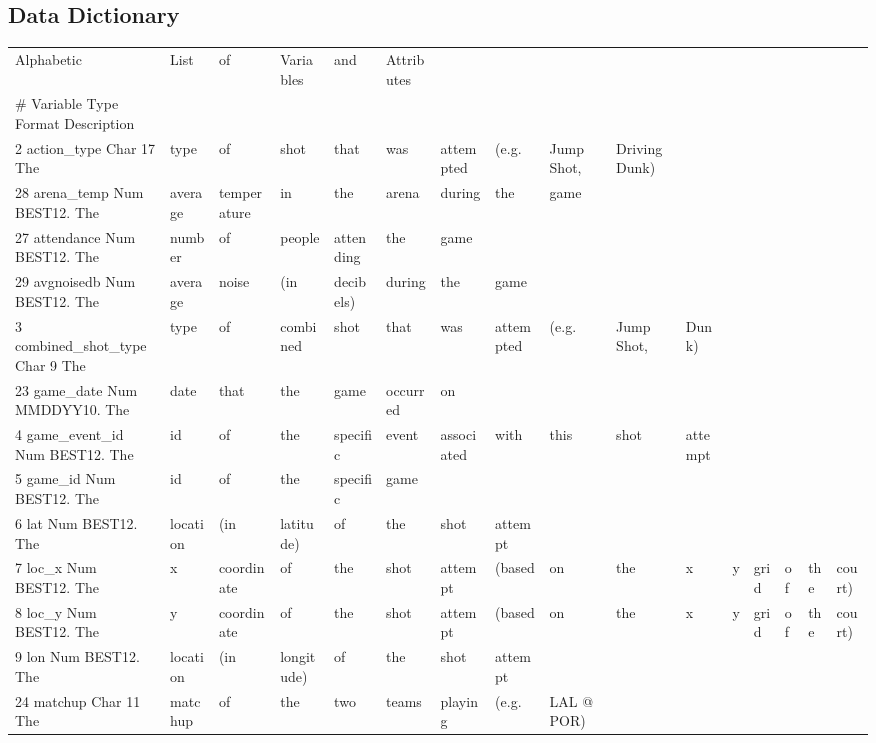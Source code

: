 \subsection{Data Dictionary}\label{datadictionary}
\begin{table}[h]
    \centering
    \begin{tabular}{llllllllllllllll}
    Alphabetic & List & of & Variables & and & Attributes &  &  &  &  &  &  &  &  &  &  \\
    \#	Variable	Type	Format	Description &  &  &  &  &  &  &  &  &  &  &  &  &  &  &  \\
    2	action\_type	Char	17	The & type & of & shot & that & was & attempted & (e.g. & Jump Shot, & Driving Dunk) &  &  &  &  &  &  \\
    28	arena\_temp	Num	BEST12.	The & average & temperature & in & the & arena & during & the & game &  &  &  &  &  &  &  \\
    27	attendance	Num	BEST12.	The & number & of & people & attending & the & game &  &  &  &  &  &  &  &  &  \\
    29	avgnoisedb	Num	BEST12.	The & average & noise & (in & decibels) & during & the & game &  &  &  &  &  &  &  &  \\
    3	combined\_shot\_type	Char	9	The & type & of & combined & shot & that & was & attempted & (e.g. & Jump Shot, & Dunk) &  &  &  &  &  \\
    23	game\_date	Num	MMDDYY10.	The & date & that & the & game & occurred & on &  &  &  &  &  &  &  &  &  \\
    4	game\_event\_id	Num	BEST12.	The & id & of & the & specific & event & associated & with & this & shot & attempt &  &  &  &  &  \\
    5	game\_id	Num	BEST12.	The & id & of & the & specific & game &  &  &  &  &  &  &  &  &  &  \\
    6	lat	Num	BEST12.	The & location & (in & latitude) & of & the & shot & attempt &  &  &  &  &  &  &  &  \\
    7	loc\_x	Num	BEST12.	The & x & coordinate & of & the & shot & attempt & (based & on & the & x & y & grid & of & the & court) \\
    8	loc\_y	Num	BEST12.	The & y & coordinate & of & the & shot & attempt & (based & on & the & x & y & grid & of & the & court) \\
    9	lon	Num	BEST12.	The & location & (in & longitude) & of & the & shot & attempt &  &  &  &  &  &  &  &  \\
    24	matchup	Char	11	The & matchup & of & the & two & teams & playing & (e.g. & LAL @ POR) &  &  &  &  &  &  &  \\

\end{tabular}
\end{table}
